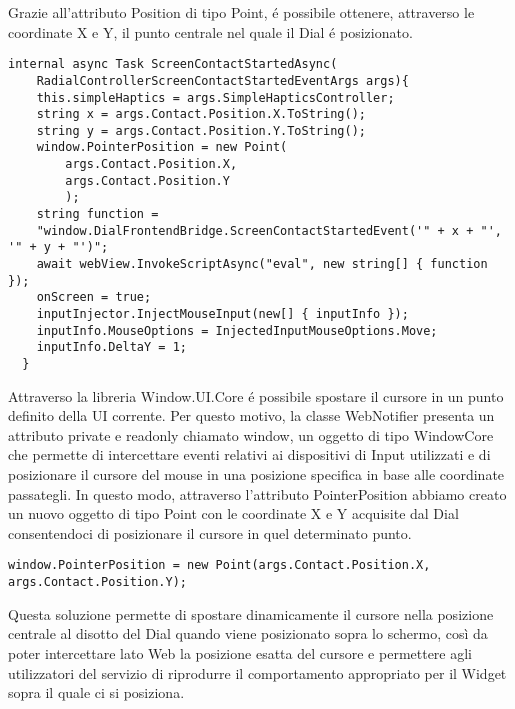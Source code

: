 Grazie all’attributo Position di tipo Point, é possibile ottenere, attraverso le coordinate X e Y, il punto centrale nel quale il Dial é posizionato.

\vspace{1.0cm}
\begin{lstlisting}[caption={Metodo ScreenContactStartedAsync},style=javaScriptCode]
 internal async Task ScreenContactStartedAsync(
 	RadialControllerScreenContactStartedEventArgs args){
    this.simpleHaptics = args.SimpleHapticsController;
    string x = args.Contact.Position.X.ToString();
    string y = args.Contact.Position.Y.ToString();
    window.PointerPosition = new Point(
    	args.Contact.Position.X, 
    	args.Contact.Position.Y
    	);
    string function = 
    "window.DialFrontendBridge.ScreenContactStartedEvent('" + x + "', '" + y + "')";
    await webView.InvokeScriptAsync("eval", new string[] { function });
    onScreen = true;
    inputInjector.InjectMouseInput(new[] { inputInfo });
    inputInfo.MouseOptions = InjectedInputMouseOptions.Move;
    inputInfo.DeltaY = 1;
  }
\end{lstlisting} 
\vspace{1.0cm}

Attraverso la libreria Window.UI.Core é possibile spostare il cursore in un punto definito della UI corrente. Per questo motivo, la classe WebNotifier presenta un attributo private e readonly chiamato window, un oggetto di tipo WindowCore che permette di intercettare eventi relativi ai dispositivi di Input utilizzati e di posizionare il cursore del mouse in una posizione specifica in base alle coordinate passategli. In questo modo, attraverso l’attributo PointerPosition abbiamo creato un nuovo oggetto di tipo Point con le coordinate X e Y acquisite dal Dial consentendoci di posizionare il cursore in quel determinato punto.
\vspace{1.0cm}
\begin{lstlisting}[caption={Spostamento cursore},style=javaScriptCode]
  window.PointerPosition = new Point(args.Contact.Position.X, args.Contact.Position.Y);
\end{lstlisting} 
\vspace{1.0cm}
Questa soluzione permette di spostare dinamicamente il cursore nella posizione centrale al disotto del Dial quando viene posizionato sopra lo schermo, così da poter intercettare lato Web la posizione esatta del cursore e permettere agli utilizzatori del servizio di riprodurre il comportamento appropriato per il Widget sopra il quale ci si posiziona.\\

